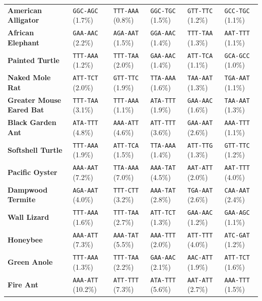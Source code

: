 \documentclass[11pt,a4paper]{article}
\renewcommand{\_}{\origunderscore\penalty200\relax}
\theoremstyle{remark}
\begin{document}
\begin{table}[H]
{{\begin{tabular}{llllll}
\textbf{American Alligator} & \texttt{GGC-AGC} (1.7\%) & \texttt{TTT-AAA} (0.8\%) & \texttt{GGC-TGC} (1.5\%) & \texttt{GTT-TTC} (1.2\%) & \texttt{GCC-TGC} (1.1\%) \\
\textbf{African Elephant} & \texttt{GAA-AAC} (2.2\%) & \texttt{AGA-AAT} (1.5\%) & \texttt{GGA-AAC} (1.4\%) & \texttt{TTT-TAA} (1.3\%) & \texttt{AAT-TTT} (1.1\%) \\
\textbf{Painted Turtle} & \texttt{TTT-AAA} (1.2\%) & \texttt{TTT-TAA} (2.0\%) & \texttt{GAA-AAC} (1.4\%) & \texttt{ATT-TCA} (1.1\%) & \texttt{GCA-GCC} (1.0\%) \\
\textbf{Naked Mole Rat} & \texttt{ATT-TCT} (2.0\%) & \texttt{GTT-TTC} (1.9\%) & \texttt{TTA-AAA} (1.6\%) & \texttt{TAA-AAT} (1.3\%) & \texttt{TGA-AAT} (1.1\%) \\
\textbf{Greater Mouse Eared Bat} & \texttt{TTT-TAA} (3.1\%) & \texttt{TTT-AAA} (1.1\%) & \texttt{ATA-TTT} (1.9\%) & \texttt{GAA-AAC} (1.6\%) & \texttt{TAA-AAT} (1.3\%) \\
\textbf{Black Garden Ant} & \texttt{ATA-TTT} (4.8\%) & \texttt{AAA-ATT} (4.6\%) & \texttt{ATT-TTT} (3.6\%) & \texttt{GAA-AAT} (2.6\%) & \texttt{AAA-TTT} (1.1\%) \\
\textbf{Softshell Turtle} & \texttt{TTT-AAA} (1.9\%) & \texttt{ATT-TCA} (1.5\%) & \texttt{TTA-AAA} (1.4\%) & \texttt{ATT-TTG} (1.3\%) & \texttt{GTT-TTC} (1.2\%) \\
\textbf{Pacific Oyster} & \texttt{AAA-AAT} (7.2\%) & \texttt{TTA-AAA} (7.0\%) & \texttt{AAA-TAT} (4.5\%) & \texttt{AAT-ATT} (2.0\%) & \texttt{AAT-TTT} (4.0\%) \\
\textbf{Dampwood Termite} & \texttt{AGA-AAT} (4.0\%) & \texttt{TTT-CTT} (3.2\%) & \texttt{AAA-TAT} (2.8\%) & \texttt{TGA-AAT} (2.6\%) & \texttt{CAA-AAT} (2.4\%) \\
\textbf{Wall Lizard} & \texttt{TTT-AAA} (1.6\%) & \texttt{TTT-TAA} (2.7\%) & \texttt{ATT-TCT} (1.3\%) & \texttt{GAA-AAC} (1.2\%) & \texttt{GAA-AGC} (1.1\%) \\
\textbf{Honeybee} & \texttt{AAA-ATT} (7.3\%) & \texttt{AAA-TAT} (5.5\%) & \texttt{AAA-TTT} (2.0\%) & \texttt{ATT-TTT} (4.0\%) & \texttt{ATC-GAT} (1.2\%) \\
\textbf{Green Anole} & \texttt{TTT-AAA} (1.3\%) & \texttt{TTT-TAA} (2.2\%) & \texttt{GAA-AAC} (2.1\%) & \texttt{AAC-ATT} (1.9\%) & \texttt{ATT-TCT} (1.6\%) \\
\textbf{Fire Ant} & \texttt{AAA-ATT} (10.2\%) & \texttt{ATT-TTT} (7.3\%) & \texttt{ATA-TTT} (5.6\%) & \texttt{AAT-ATT} (2.7\%) & \texttt{AAA-TTT} (1.5\%) \\

\end{tabular}}}
\end{table}
\end{document}
